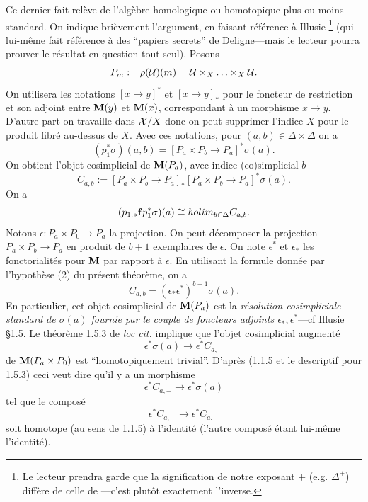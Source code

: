 \documentclass[12pt]{article}
\newcommand{\mm}{{\bf M}}
\newcommand{\Uu}{{\cal U}}
\newcommand{\Xx}{{\cal X}}
\begin{document}
Ce dernier fait rel\`eve de l'alg\`ebre homologique ou homotopique plus ou moins
standard. On indique bri\`evement
l'argument, en faisant r\'ef\'erence \`a Illusie
\cite{Illusie}
\footnote{
Le lecteur prendra garde que la signification de
notre exposant $+$ (e.g. $\Delta
^+$) diff\`ere de celle de \cite{Illusie}---c'est
plut\^ot exactement l'inverse.}
(qui lui-m\^eme fait r\'ef\'erence \`a des ``papiers
secrets'' de Deligne---mais le lecteur pourra prouver le r\'esultat en question
tout seul). Posons $$
P_m:= \rho (\Uu )(m) = \Uu \times _X\ldots \times _X \Uu .
$$
On utilisera les notations $[x\rightarrow y]^{\ast}$ et
$[x\rightarrow y]_{\ast}$ pour le foncteur de restriction et son adjoint
entre $\mm (y)$ et $\mm (x)$,
correspondant \`a un morphisme $x\rightarrow y$. D'autre
part on travaille dans $\Xx /X$ donc on peut supprimer l'indice $X$ pour le
produit fibr\'e au-dessus de $X$.
Avec ces notations, pour $(a,b)\in \Delta \times \Delta$ on a
$$
(p_1^{\ast} \sigma )(a,b)=
[P_a \times P_b \rightarrow P_a]^{\ast} \sigma (a).
$$
On obtient l'objet cosimplicial de $\mm (P_a)$, avec indice
(co)simplicial $b$
$$
C_{a,b}:= [P_a \times P_b \rightarrow P_a]_{\ast}
[P_a \times P_b \rightarrow P_a]^{\ast}\sigma (a).
$$
On a
$$
(p _{1,\ast} {\bf f}p_1^{\ast} \sigma )(a)\cong
holim _{b\in \Delta} C_{a,b}.
$$
Notons $\epsilon : P_a\times P_0 \rightarrow P_a$
la projection. On peut d\'ecomposer
la projection $P_a\times P_b\rightarrow P_a$ en produit de $b+1$ exemplaires de
$\epsilon$. On note $\epsilon ^{\ast}$ et $\epsilon _{\ast}$ les
fonctorialit\'es pour $\mm$ par rapport \`a $\epsilon$. En utilisant la formule
donn\'ee par l'hypoth\`ese (2) du pr\'esent th\'eor\`eme, on a
$$
C_{a,b} = (\epsilon _{\ast} \epsilon ^{\ast} )^{b+1}\sigma (a).
$$
En particulier, cet objet cosimplicial de $\mm (P_a)$ est la {\em r\'esolution
cosimpliciale standard de $\sigma (a)$ fournie par le couple de foncteurs
adjoints $\epsilon _{\ast}, \epsilon ^{\ast}$}---cf Illusie \cite{Illusie}
\S 1.5. Le th\'eor\`eme 1.5.3 de {\em loc cit.} implique que
l'objet cosimplicial augment\'e
$$
\epsilon ^{\ast} \sigma (a) \rightarrow \epsilon ^{\ast} C_{a,-}
$$
de $\mm (P_a\times P_0)$ est ``homotopiquement trivial''.
D'apr\`es \cite{Illusie} (1.1.5 et le descriptif pour 1.5.3) ceci veut dire
qu'il y a un morphisme
$$
\epsilon ^{\ast} C_{a,-}\rightarrow \epsilon ^{\ast} \sigma (a)
$$
tel que le compos\'e
$$
\epsilon ^{\ast} C_{a,-}\rightarrow
\epsilon ^{\ast} C_{a,-}
$$
soit homotope (au sens de \cite{Illusie} 1.1.5) \`a l'identit\'e
(l'autre compos\'e \'etant lui-m\^eme l'i\-den\-ti\-t\'e).
\end{document}
